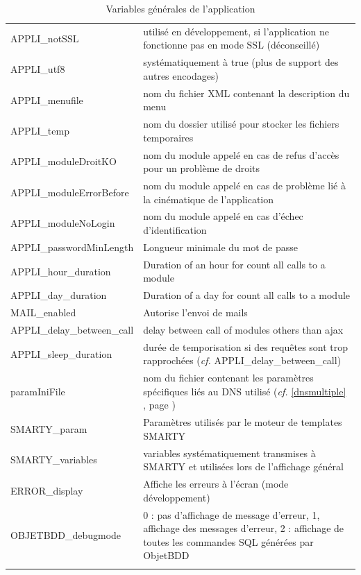 \begin{longtable}{|p{5cm}|p{8cm}|}
APPLI\_notSSL & utilisé en développement, si l'application ne fonctionne pas en mode SSL (déconseillé) \\

APPLI\_utf8 & systématiquement à true (plus de support des autres encodages)\\

APPLI\_menufile & nom du fichier XML contenant la description du menu\\

APPLI\_temp & nom du dossier utilisé pour stocker les fichiers temporaires\\

APPLI\_moduleDroitKO & nom du module appelé en cas de refus d'accès pour un problème de droits \\

APPLI\_moduleErrorBefore & nom du module appelé en cas de problème lié à la cinématique de l'application\\

APPLI\_moduleNoLogin & nom du module appelé en cas d'échec d'identification \\

APPLI\_passwordMinLength  & Longueur minimale du mot de passe \\
APPLI\_hour\_duration  & Duration of an hour for count all calls to a module\\
APPLI\_day\_duration  & Duration of a day for count all calls to a module \\
MAIL\_enabled & Autorise l'envoi de mails \\
APPLI\_delay\_between\_call & delay between call of modules others than ajax \\
APPLI\_sleep\_duration  & durée de temporisation si des requêtes sont trop rapprochées (\textit{cf.} APPLI\_delay\_between\_call) \\

paramIniFile & nom du fichier contenant les paramètres spécifiques liés au DNS utilisé (\textit{cf.} \ref{dnsmultiple} \textit{\nameref{dnsmultiple}}, page \pageref{dnsmultiple}) \\

SMARTY\_param & Paramètres utilisés par le moteur de templates SMARTY\\

SMARTY\_variables & variables systématiquement transmises à SMARTY et utilisées lors de l'affichage général\\

ERROR\_display & Affiche les erreurs à l'écran (mode développement)\\

OBJETBDD\_debugmode & 0 : pas d'affichage de message d'erreur, 1, affichage des messages d'erreur, 2 : affichage de toutes les commandes SQL générées par ObjetBDD \\

\hline
\caption{Variables générales de l'application}
\end{longtable} 

